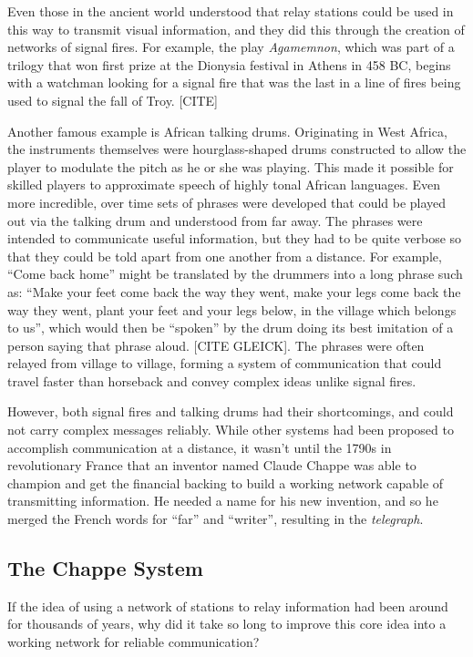 \documentclass[UTF8]{book}
\begin{document}
\begin{CJK}{UTF8}{gbsn}
Even those in the ancient world understood that relay stations could be used in this way to transmit visual information, and they did this through the creation of networks of signal fires. For example, the play \emph{Agamemnon}, which was part of a trilogy that won first prize at the Dionysia festival in Athens in 458 BC, begins with a watchman looking for a signal fire that was the last in a line of fires being used to signal the fall of Troy. [CITE]

Another famous example is African talking drums. Originating in West Africa, the instruments themselves were hourglass-shaped drums constructed to allow the player to modulate the pitch as he or she was playing. This made it possible for skilled players to approximate speech of highly tonal African languages. Even more incredible, over time sets of phrases were developed that could be played out via the talking drum and understood from far away. The phrases were intended to communicate useful information, but they had to be quite verbose so that they could be told apart from one another from a distance. For example, ``Come back home'' might be translated by the drummers into a long phrase such as: ``Make your feet come back the way they went, make your legs come back the way they went, plant your feet and your legs below, in the village which belongs to us'', which would then be ``spoken'' by the drum doing its best imitation of a person saying that phrase aloud. [CITE GLEICK]. The phrases were often relayed from village to village, forming a system of communication that could travel faster than horseback and convey complex ideas unlike signal fires.

However, both signal fires and talking drums had their shortcomings, and could not carry complex messages reliably. While other systems had been proposed to accomplish communication at a distance, it wasn't until the 1790s in revolutionary France that an inventor named Claude Chappe was able to champion and get the financial backing to build a working network capable of transmitting information. He needed a name for his new invention, and so he merged the French words for ``far'' and ``writer'', resulting in the \emph{telegraph}.

\subsection{The Chappe System}

If the idea of using a network of stations to relay information had been around for thousands of years, why did it take so long to improve this core idea into a working network for reliable communication?


\end{CJK}
\end{document}
